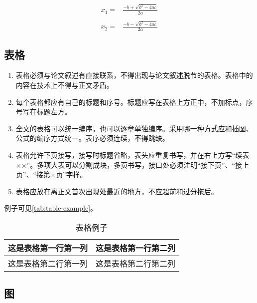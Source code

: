 \begin{equation}
    \label{eq:example-formulas2}
    \begin{split}
        x_1 = & \frac{-b+\sqrt{b^2-4ac}}{2a} \\
        & \\
        x_2 = & \frac{-b-\sqrt{b^2-4ac}}{2a}
    \end{split}
\end{equation}

\subsection{表格}

\begin{enumerate}
    \item 表格必须与论文叙述有直接联系，不得出现与论文叙述脱节的表格。表格中的内容在技术上不得与正文矛盾。
    \item 每个表格都应有自己的标题和序号。标题应写在表格上方正中，不加标点，序号写在标题左方。
    \item 全文的表格可以统一编序，也可以逐章单独编序。采用哪一种方式应和插图、公式的编序方式统一。表序必须连续，不得跳缺。
    \item 表格允许下页接写，接写时标题省略，表头应重复书写，并在右上方写``续表××''。多项大表可以分割成块，多页书写，接口处必须注明``接下页''、``接上页''、``接第×页''字样。
    \item 表格应放在离正文首次出现处最近的地方，不应超前和过分拖后。
\end{enumerate}


例子可见\autoref{tab:table-example}。

\begin{table}[!htbp]
    \centering
    \caption{表格例子}
    \label{tab:table-example}
    \begin{tabular}{|l|l|}
        \hline
        \multicolumn{1}{|c|}{这是表格第一行第一列} & 这是表格第一行第二列 \\ \hline
        这是表格第二行第一列                       & 这是表格第二行第二列 \\ \hline
    \end{tabular}
\end{table}

\subsection{图}


